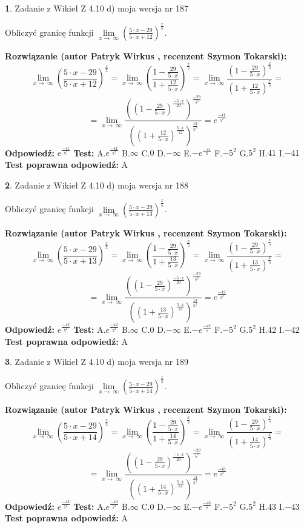 \documentclass[12pt, a4paper]{article}
\theoremstyle{definition} %
\newtheorem{zad}{}
\newcommand{\zadStart}[1]{\begin{zad}#1\newline}
\newcommand{\zadStop}{\end{zad}}
\newcommand{\rozwStart}[2]{\noindent \textbf{Rozwiązanie (autor #1 , recenzent #2): }\newline}
\newcommand{\rozwStop}{\newline}
\newcommand{\odpStart}{\noindent \textbf{Odpowiedź:}\newline}
\newcommand{\odpStop}{\newline}
\newcommand{\testStart}{\noindent \textbf{Test:}\newline}
\newcommand{\testStop}{\newline}
\newcommand{\kluczStart}{\noindent \textbf{Test poprawna odpowiedź:}\newline}
\newcommand{\kluczStop}{\newline}
\begin{document}
\zadStart{Zadanie z Wikieł Z 4.10 d) moja wersja nr 187}


Obliczyć granicę funkcji  $\lim\limits_{x\to\ \infty}(\frac{5\cdot x-29}{5\cdot x+12})^{\frac{x}{5}}$.
\zadStop
\rozwStart{Patryk Wirkus}{Szymon Tokarski}
$$\lim\limits_{x\to\ \infty}(\frac{5\cdot x-29}{5\cdot x+12})^{\frac{x}{5}} = \lim\limits_{x\to\ \infty}(\frac{1-\frac{29}{5\cdot x}}{1+\frac{12}{5\cdot x}})^{\frac{x}{5}}=\lim\limits_{x\to\ \infty}\frac{(1-\frac{29}{5\cdot x})^{\frac{x}{5}}}{(1+\frac{12}{5\cdot x})^{\frac{x}{5}}}=$$
$$=\lim\limits_{x\to\ \infty}\frac{((1-\frac{29}{5\cdot x})^{\frac{-5\cdot x}{29}})^{\frac{-29}{5^{2}}}}{((1+\frac{12}{5\cdot x})^{\frac{5\cdot x}{12}})^{\frac{12}{5^{2}}}}=e^{\frac{-41}{5^{2}}}$$
\rozwStop
\odpStart
$e^{\frac{-41}{5^{2}}}$
\odpStop
\testStart
A.$e^{\frac{-41}{5^{2}}}$ B.$\infty$ C.$0$ D.$-\infty$ E.$-e^{\frac{-41}{5}}$
F.$-5^{2}$ G.$5^{2}$
H.$41$
I.$-41$
\testStop
\kluczStart
A
\kluczStop



\zadStart{Zadanie z Wikieł Z 4.10 d) moja wersja nr 188}


Obliczyć granicę funkcji  $\lim\limits_{x\to\ \infty}(\frac{5\cdot x-29}{5\cdot x+13})^{\frac{x}{5}}$.
\zadStop
\rozwStart{Patryk Wirkus}{Szymon Tokarski}
$$\lim\limits_{x\to\ \infty}(\frac{5\cdot x-29}{5\cdot x+13})^{\frac{x}{5}} = \lim\limits_{x\to\ \infty}(\frac{1-\frac{29}{5\cdot x}}{1+\frac{13}{5\cdot x}})^{\frac{x}{5}}=\lim\limits_{x\to\ \infty}\frac{(1-\frac{29}{5\cdot x})^{\frac{x}{5}}}{(1+\frac{13}{5\cdot x})^{\frac{x}{5}}}=$$
$$=\lim\limits_{x\to\ \infty}\frac{((1-\frac{29}{5\cdot x})^{\frac{-5\cdot x}{29}})^{\frac{-29}{5^{2}}}}{((1+\frac{13}{5\cdot x})^{\frac{5\cdot x}{13}})^{\frac{13}{5^{2}}}}=e^{\frac{-42}{5^{2}}}$$
\rozwStop
\odpStart
$e^{\frac{-42}{5^{2}}}$
\odpStop
\testStart
A.$e^{\frac{-42}{5^{2}}}$ B.$\infty$ C.$0$ D.$-\infty$ E.$-e^{\frac{-42}{5}}$
F.$-5^{2}$ G.$5^{2}$
H.$42$
I.$-42$
\testStop
\kluczStart
A
\kluczStop



\zadStart{Zadanie z Wikieł Z 4.10 d) moja wersja nr 189}


Obliczyć granicę funkcji  $\lim\limits_{x\to\ \infty}(\frac{5\cdot x-29}{5\cdot x+14})^{\frac{x}{5}}$.
\zadStop
\rozwStart{Patryk Wirkus}{Szymon Tokarski}
$$\lim\limits_{x\to\ \infty}(\frac{5\cdot x-29}{5\cdot x+14})^{\frac{x}{5}} = \lim\limits_{x\to\ \infty}(\frac{1-\frac{29}{5\cdot x}}{1+\frac{14}{5\cdot x}})^{\frac{x}{5}}=\lim\limits_{x\to\ \infty}\frac{(1-\frac{29}{5\cdot x})^{\frac{x}{5}}}{(1+\frac{14}{5\cdot x})^{\frac{x}{5}}}=$$
$$=\lim\limits_{x\to\ \infty}\frac{((1-\frac{29}{5\cdot x})^{\frac{-5\cdot x}{29}})^{\frac{-29}{5^{2}}}}{((1+\frac{14}{5\cdot x})^{\frac{5\cdot x}{14}})^{\frac{14}{5^{2}}}}=e^{\frac{-43}{5^{2}}}$$
\rozwStop
\odpStart
$e^{\frac{-43}{5^{2}}}$
\odpStop
\testStart
A.$e^{\frac{-43}{5^{2}}}$ B.$\infty$ C.$0$ D.$-\infty$ E.$-e^{\frac{-43}{5}}$
F.$-5^{2}$ G.$5^{2}$
H.$43$
I.$-43$
\testStop
\kluczStart
A
\kluczStop
\end{document}
